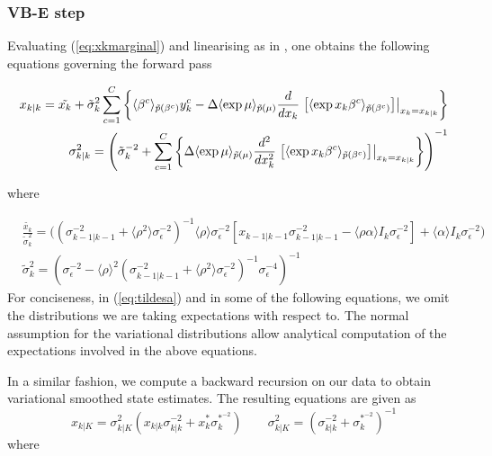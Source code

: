\documentclass{article}
\begin{document}
\subsubsection{VB-E step}\label{sec:VBE}

Evaluating (\ref{eq:xkmarginal}) and linearising as in \cite{Smith_2003}, one obtains the following
equations governing the forward pass

\begin{subequations} \begin{align} x_{k|k} = \tilde{x_k} +\tilde{\sigma}^2_k \sum_{c=1}^C
	\left\{\langle\beta^c\rangle_{\pt(\beta^c)}y^c_k - \Delta \langle \exp{\mu}
	\rangle_{\pt(\mu)} \frac{d}{dx_{k}}\left.\left[\langle \exp{x_k\beta^c}
	\rangle_{\pt(\beta^c)}\right]\right|_{x_k = x_{k | k}}  \right\} \label{eq:NL1} \\
	\sigma^2_{k|k} = \left(\tilde{\sigma}^{-2}_k + \sum_{c=1}^C \left\{\Delta  \langle \exp{\mu}
	\rangle_{\pt(\mu)} \frac{d^2}{dx_k^2}\left.\left[\langle \exp{x_k\beta^c}
	\rangle_{\pt(\beta^c)}\right]\right|_{x_k = x_{k | k}}\right\}\right)^{-1} \end{align}
\end{subequations}

\noindent where


\begin{equation}\begin{split}\label{eq:tildesa} &\frac{\tilde{x_k}}{\tilde{\sigma}^2_k}=
	\bigg((\sigma^{-2}_{k-1|k-1} + \langle \rho^2 \rangle \sigma^{-2}_\epsilon )^{-1} \langle
	\rho \rangle\sigma^{-2}_\epsilon\left[x_{k-1|k-1}\sigma^{-2}_{k-1|k-1} - \langle \rho\alpha
	\rangle I_k\sigma^{-2}_\epsilon \right] + \langle \alpha \rangle I_k\sigma^{-2}_\epsilon
	\bigg)  \\ &\tilde{\sigma}^2_k = (\sigma^{-2}_\epsilon - \langle \rho \rangle^2
	(\sigma^{-2}_{k-1|k-1} + \langle \rho^2 \rangle \sigma^{-2}_\epsilon
	)^{-1}\sigma^{-4}_\epsilon  )^{-1} \end{split}\end{equation} For conciseness, in
	(\ref{eq:tildesa})  and in some of the following equations, we omit the distributions we are
	taking expectations with respect to. The normal assumption for the variational distributions
	allow analytical computation of the expectations involved in the above equations.

In a similar fashion, we compute a backward recursion on our data to obtain variational smoothed
state estimates. The resulting equations are given as \begin{equation} x_{k|K} =
	\sigma^2_{k|K}(x_{k|k}\sigma^{-2}_{k|k} + x_{k}^*\sigma^{*^{-2}}_{k}) \qquad \sigma^2_{k|K}
	= (\sigma^{-2}_{k|k} + \sigma^{*^{-2}}_{k})^{-1} \end{equation} 	\noindent where
\end{document}

